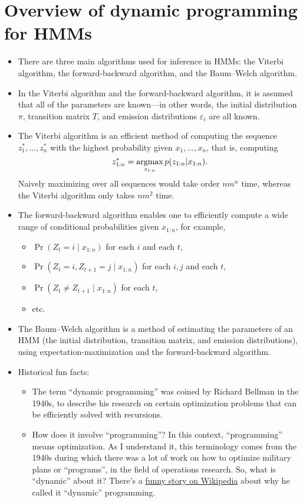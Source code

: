 \documentclass[12pt]{article}
\begin{document}
\section{Overview of dynamic programming for HMMs}

\begin{itemize}
\item There are three main algorithms used for inference in HMMs: the Viterbi algorithm, the forward-backward algorithm, and the Baum--Welch algorithm.
\item In the Viterbi algorithm and the forward-backward algorithm, it is assumed that all of the parameters are known---in other words, the initial distribution $\pi$, transition matrix $T$, and emission distributions $\varepsilon_i$ are all known.
\item The Viterbi algorithm is an efficient method of computing the sequence $z_1^*,\ldots,z_n^*$ with the highest probability given $x_1,\ldots,x_n$, that is, computing
$$ z_{1:n}^*= \operatorname*{argmax}_{z_{1:n}} p(z_{1:n} | x_{1:n}). $$
Naively maximizing over all sequences would take order $n m^n$ time, whereas the Viterbi algorithm only takes $n m^2$ time.
\item The forward-backward algorithm enables one to efficiently compute a wide range of conditional probabilities given $x_{1:n}$, for example,
\begin{itemize}
\item $\Pr(Z_t = i \mid x_{1:n})$ for each $i$ and each $t$,
\item $\Pr(Z_t = i, Z_{t+1}=j \mid x_{1:n})$ for each $i,j$ and each $t$,
\item $\Pr(Z_t \neq Z_{t+1} \mid x_{1:n})$ for each $t$,
\item etc.
\end{itemize}
\item The Baum--Welch algorithm is a method of estimating the parameters of an HMM (the initial distribution, transition matrix, and emission distributions), using expectation-maximization and the forward-backward algorithm.
\item Historical fun facts:
\begin{itemize}
\item The term ``dynamic programming'' was coined by Richard Bellman in the 1940s, to describe his research on certain optimization problems that can be efficiently solved with recursions.
\item How does it involve ``programming''? In this context, ``programming'' means optimization. As I understand it, this terminology comes from the 1940s during which there was a lot of work on how to optimize military plans or ``programs'', in the field of operations research. So, what is ``dynamic'' about it? There's a \href{https://en.wikipedia.org/wiki/Dynamic_programming#History}{funny story on Wikipedia} about why he called it ``dynamic'' programming.
\end{itemize}
\end{itemize}
\end{document}

